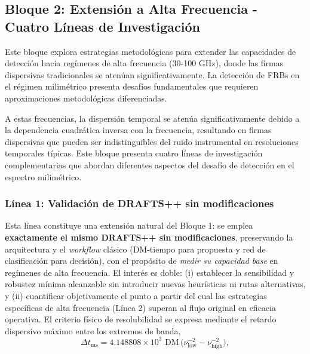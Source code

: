 \subsection{Bloque 2: Extensión a Alta Frecuencia - Cuatro Líneas de Investigación}

Este bloque explora estrategias metodológicas para extender las capacidades de detección hacia regímenes de alta frecuencia (30-100 GHz), donde las firmas dispersivas tradicionales se atenúan significativamente. La detección de FRBs en el régimen milimétrico presenta desafíos fundamentales que requieren aproximaciones metodológicas diferenciadas.

A estas frecuencias, la dispersión temporal se atenúa significativamente debido a la dependencia cuadrática inversa con la frecuencia, resultando en firmas dispersivas que pueden ser indistinguibles del ruido instrumental en resoluciones temporales típicas. Este bloque presenta cuatro líneas de investigación complementarias que abordan diferentes aspectos del desafío de detección en el espectro milimétrico.

\subsubsection{Línea 1: Validación de DRAFTS++ sin modificaciones}

Esta línea constituye una extensión natural del Bloque 1: se emplea \textbf{exactamente el mismo DRAFTS++ sin modificaciones}, preservando la arquitectura y el \emph{workflow} clásico (DM-tiempo para propuesta y red de clasificación para decisión), con el propósito de \textit{medir su capacidad base} en regímenes de alta frecuencia. El interés es doble: (i) establecer la sensibilidad y robustez mínima alcanzable sin introducir nuevas heurísticas ni rutas alternativas, y (ii) cuantificar objetivamente el punto a partir del cual las estrategias específicas de alta frecuencia (Línea 2) superan al flujo original en eficacia operativa. El criterio físico de resolubilidad se expresa mediante el retardo dispersivo máximo entre los extremos de banda,
\[
\Delta t_{\mathrm{ms}} = 4.148808 \times 10^{3}\,\, \mathrm{DM}\,\big(\nu_{\mathrm{low}}^{-2}-\nu_{\mathrm{high}}^{-2}\big),
\]

